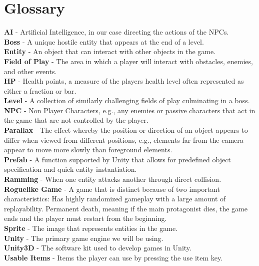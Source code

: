 \documentclass[12pt]{article}       %
\begin{document}
\newpage

\section{Glossary}
\label{sec:gloss}

{\bf{AI}} - Artificial Intelligence, in our case directing the actions of the NPCs. \\
{\bf Boss} - A unique hostile entity that appears at the end of a level. \\
{\bf Entity} - An object that can interact with other objects in the game. \\
{\bf Field of Play} - The area in which a player will interact with obstacles, enemies, and other events. \\
{\bf HP} - Health points, a measure of the players health level often represented as either a fraction or bar. \\
{\bf Level} - A collection of similarly challenging fields of play culminating in a boss. \\
{\bf NPC} - Non Player Characters, e.g., any enemies or passive characters that act in the game that are not controlled by the player. \\
{\bf Parallax} - The effect whereby the position or direction of an object appears to differ when viewed from different positions, e.g., elements far from the camera appear to move more slowly than foreground elements. \\
{\bf Prefab} - A function supported by Unity that allows for predefined object specification and quick entity instantiation. \\
{\bf Ramming} - When one entity attacks another through direct collision. \\
{\bf Roguelike Game} - A game that is distinct because of two important characteristics:
Has highly randomized gameplay with a large amount of replayability. 
Permanent death, meaning if the main protagonist dies, the game ends and the player must restart from the beginning. \\
{\bf Sprite} - The image that represents entities in the game. \\
{\bf Unity} - The primary game engine we will be using. \\
{\bf Unity3D} - The software kit used to develop games in Unity. \\
{\bf Usable Items} - Items the player can use by pressing the use item key. \\
\end{document}
